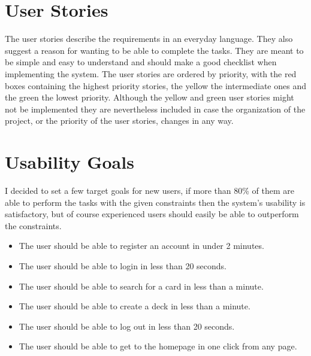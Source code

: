 \documentclass[paper=a4, fontsize=11pt]{scrartcl} %
\numberwithin{equation}{section} %
\numberwithin{figure}{section} %
\numberwithin{table}{section} %
\begin{document}
\section{User Stories}
The user stories describe the requirements in an everyday language. They also suggest a reason for wanting to be able to complete the tasks. They are meant to be simple and easy to understand and should make a good checklist when implementing the system. The user stories are ordered by priority, with the red boxes containing the highest priority stories, the yellow the intermediate ones and the green the lowest priority. Although the yellow and green user stories might not be implemented they are nevertheless included in case the organization of the project, or the priority of the user stories, changes in any way.
\begin{center}
\end{center}

\section{Usability Goals}
I decided to set a few target goals for new users, if more than 80\% of them are able to perform the tasks with the given constraints then the system’s usability is satisfactory, but of course experienced users should easily be able to outperform the constraints.
\begin{itemize}
  \item The user should be able to register an account in under 2 minutes.
  \item The user should be able to login in less than 20 seconds.
  \item The user should be able to search for a card in less than a minute.
  \item The user should be able to create a deck in less than a minute.
  \item The user should be able to log out in less than 20 seconds.
  \item The user should be able to get to the homepage in one click from any page.
\end{itemize}
\end{document}
